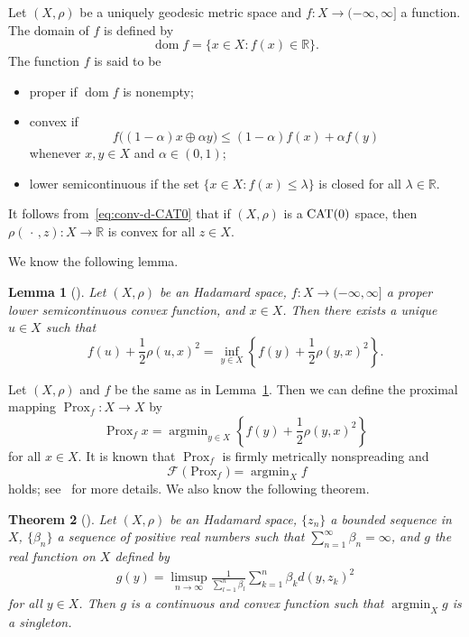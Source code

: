\documentclass[draft]{amsart}
\numberwithin{equation}{section}
\def\R{\mathbb R}
\DeclareMathOperator*{\Argmin}{argmin}
\DeclareMathOperator{\Fix}{\mathcal{F}}
\DeclareMathOperator{\Dom}{dom}
\DeclareMathOperator{\Prox}{Prox}
\newcommand{\CAT}{\textup{CAT}}
\theoremstyle{plain}
\newtheorem{theorem}{Theorem}[section]
\newtheorem{lemma}[theorem]{Lemma}
\theoremstyle{definition}
\theoremstyle{remark}
\begin{document}
Let $(X, \rho)$ be a uniquely geodesic metric space 
and $f\colon X\to (-\infty, \infty]$ a function. 
The domain of $f$ is defined by 
\[
 \Dom f=\{x\in X: f(x)\in \R\}. 
\]
The function $f$ is said to be 
\begin{itemize}
 \item proper if $\Dom f$ is nonempty; 
 \item convex if 
 \[
  f\bigl((1-\alpha)x\oplus \alpha y\bigr) 
  \leq (1-\alpha) f(x) + \alpha f(y)
 \]
 whenever $x,y\in X$ and $\alpha\in (0,1)$; 
 \item lower semicontinuous if the set 
 $\{x\in X: f(x)\leq \lambda\}$ is closed for all $\lambda\in \R$. 
\end{itemize}
It follows from~\eqref{eq:conv-d-CAT0} that 
if $(X, \rho)$ is a $\CAT(0)$ space, then 
$\rho(\,\cdot\,, z)\colon X\to \R$ is convex for all $z\in X$. 

We know the following lemma. 
\begin{lemma}[\cites{MR3241330, MR1360608, MR1651416}]
\label{lem:prox-well-def}
 Let $(X, \rho)$ be an Hadamard space, 
 $f\colon X\to (-\infty, \infty]$ a proper lower semicontinuous 
 convex function, and $x\in X$. 
 Then there exists a unique $u\in X$ such that 
 \[
  f(u) + \frac{1}{2}\rho(u, x)^2 
  = \inf_{y\in X} 
  \left\{f(y) + \frac{1}{2}\rho(y, x)^2\right\}. 
 \]
\end{lemma}

Let $(X, \rho)$ and $f$ 
be the same as in Lemma~\ref{lem:prox-well-def}. 
Then we can define the proximal mapping 
$\Prox_f\colon X\to X$ by 
\[
 \Prox_{f}x = \Argmin_{y\in X} 
 \left\{f(y) + \frac{1}{2}\rho(y, x)^2\right\}
\]
for all $x\in X$. It is known that 
$\Prox_f$ is firmly metrically nonspreading and 
\[
 \Fix \bigl(\Prox_f\bigr) = \Argmin_X f
\]
holds; see~\cites{MR3047087, MR3241330, MR3574140, MR4021035} 
for more details. We also know the following theorem. 
\begin{theorem}[\cite{MR3574140}]\label{thm:min-g}
 Let $(X, \rho)$ be an Hadamard space, 
 $\{z_n\}$ a bounded sequence in $X$, 
 $\{\beta_n\}$ a sequence of positive real numbers such that 
 $\sum_{n=1}^{\infty}\beta_n=\infty$, 
 and $g$ the real function on $X$ defined by 
 \begin{align*}
  g(y) = \limsup_{n\to \infty} 
  \frac{1}{\sum_{l=1}^n \beta_l}
  \sum_{k=1}^n \beta_k d(y, z_k)^2 
 \end{align*}
 for all $y\in X$. Then 
 $g$ is a continuous and convex function 
 such that $\Argmin_X g$ is a singleton. 
\end{theorem}
\end{document}
